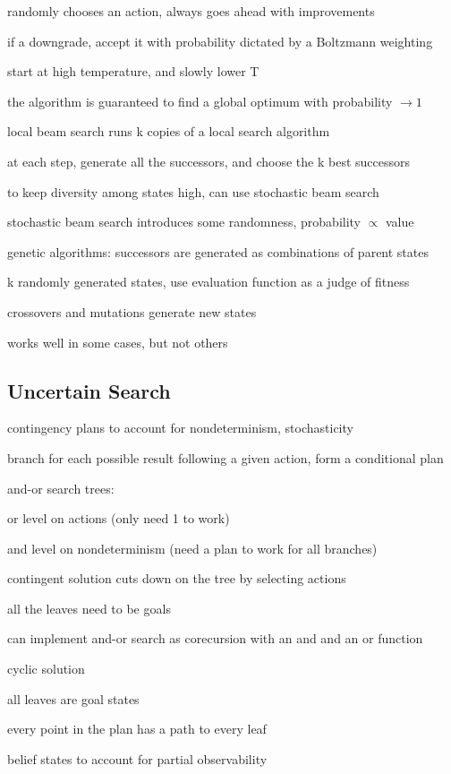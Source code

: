 \documentclass[12pt]{article}
\begin{document}
randomly chooses an action, always goes ahead with improvements

if a downgrade, accept it with probability dictated by a Boltzmann weighting

start at high temperature, and slowly lower T

the algorithm is guaranteed to find a global optimum with probability $\to 1$

\noindent
local beam search runs k copies of a local search algorithm

at each step, generate all the successors, and choose the k best successors

to keep diversity among states high, can use stochastic beam search

stochastic beam search introduces some randomness, probability $\propto$ value

\noindent
genetic algorithms: successors are generated as combinations of parent states

k randomly generated states, use evaluation function as a judge of fitness

crossovers and mutations generate new states

works well in some cases, but not others

\subsection{Uncertain Search}

\noindent
contingency plans to account for nondeterminism, stochasticity

branch for each possible result following a given action, form a conditional plan

\noindent
and-or search trees:

or level on actions (only need 1 to work)

and level on nondeterminism (need a plan to work for all branches)

contingent solution cuts down on the tree by selecting actions

all the leaves need to be goals

can implement and-or search as corecursion with an and and an or function

\noindent
cyclic solution

all leaves are goal states

every point in the plan has a path to every leaf

\noindent
belief states to account for partial observability
\end{document}
